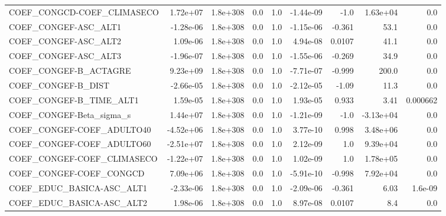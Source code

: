 \begin{tabular}{lrrrrrrrr}
COEF\_CONGCD-COEF\_CLIMASECO        &    1.72e+07 &     1.8e+308 &     0.0 &      1.0 &  -1.44e-09 &        -1.0 &     1.63e+04 &           0.0 \\
COEF\_CONGEF-ASC\_ALT1              &   -1.28e-06 &     1.8e+308 &     0.0 &      1.0 &  -1.15e-06 &      -0.361 &         53.1 &           0.0 \\
COEF\_CONGEF-ASC\_ALT2              &    1.09e-06 &     1.8e+308 &     0.0 &      1.0 &   4.94e-08 &      0.0107 &         41.1 &           0.0 \\
COEF\_CONGEF-ASC\_ALT3              &   -1.96e-07 &     1.8e+308 &     0.0 &      1.0 &  -1.55e-06 &      -0.269 &         34.9 &           0.0 \\
COEF\_CONGEF-B\_ACTAGRE             &    9.23e+09 &     1.8e+308 &     0.0 &      1.0 &  -7.71e-07 &      -0.999 &        200.0 &           0.0 \\
COEF\_CONGEF-B\_DIST                &   -2.66e-05 &     1.8e+308 &     0.0 &      1.0 &  -2.12e-05 &       -1.09 &         11.3 &           0.0 \\
COEF\_CONGEF-B\_TIME\_ALT1           &    1.59e-05 &     1.8e+308 &     0.0 &      1.0 &   1.93e-05 &       0.933 &         3.41 &      0.000662 \\
COEF\_CONGEF-Beta\_sigma\_s          &    1.44e+07 &     1.8e+308 &     0.0 &      1.0 &  -1.21e-09 &        -1.0 &    -3.13e+04 &           0.0 \\
COEF\_CONGEF-COEF\_ADULTO40         &   -4.52e+06 &     1.8e+308 &     0.0 &      1.0 &   3.77e-10 &       0.998 &     3.48e+06 &           0.0 \\
COEF\_CONGEF-COEF\_ADULTO60         &   -2.51e+07 &     1.8e+308 &     0.0 &      1.0 &   2.12e-09 &         1.0 &     9.39e+04 &           0.0 \\
COEF\_CONGEF-COEF\_CLIMASECO        &   -1.22e+07 &     1.8e+308 &     0.0 &      1.0 &   1.02e-09 &         1.0 &     1.78e+05 &           0.0 \\
COEF\_CONGEF-COEF\_CONGCD           &    7.09e+06 &     1.8e+308 &     0.0 &      1.0 &  -5.91e-10 &      -0.998 &     7.92e+04 &           0.0 \\
COEF\_EDUC\_BASICA-ASC\_ALT1         &   -2.33e-06 &     1.8e+308 &     0.0 &      1.0 &  -2.09e-06 &      -0.361 &         6.03 &       1.6e-09 \\
COEF\_EDUC\_BASICA-ASC\_ALT2         &    1.98e-06 &     1.8e+308 &     0.0 &      1.0 &   8.97e-08 &      0.0107 &          8.4 &           0.0 \\

\end{tabular}
